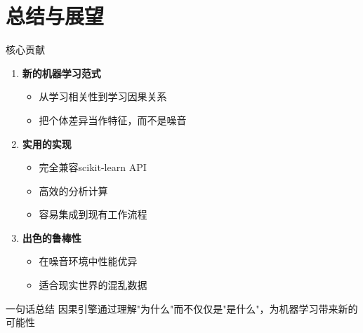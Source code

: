 \documentclass[aspectratio=169,12pt]{beamer}
\begin{document}
\section{总结与展望}

\begin{frame}{核心贡献}
\begin{enumerate}
    \item \textbf{新的机器学习范式}
    \begin{itemize}
        \item 从学习相关性到学习因果关系
        \item 把个体差异当作特征，而不是噪音
    \end{itemize}
    
    \item \textbf{实用的实现}
    \begin{itemize}
        \item 完全兼容scikit-learn API
        \item 高效的分析计算
        \item 容易集成到现有工作流程
    \end{itemize}
    
    \item \textbf{出色的鲁棒性}
    \begin{itemize}
        \item 在噪音环境中性能优异
        \item 适合现实世界的混乱数据
    \end{itemize}
\end{enumerate}

\vspace{1em}
\begin{block}{一句话总结}
因果引擎通过理解"为什么"而不仅仅是"是什么"，为机器学习带来新的可能性
\end{block}
\end{frame}
\end{document}
